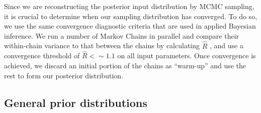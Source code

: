 \documentclass[10pt,letterpaper]{article}
\begin{document}
Since we are reconstructing the posterior input distribution by MCMC sampling, it is crucial to determine when our sampling distribution has converged. To do so, we use the same convergence diagnostic criteria that are used in applied Bayesian inference. We run a number of Markov Chains in parallel and compare their within-chain variance to that between the chains by calculating $\hat{R}$ \cite{gelman1992inference}, and use a convergence threshold of $\hat{R}<\sim 1.1$ on all input parameters. Once convergence is achieved, we discard an initial portion of the chains as ``warm-up'' \cite{gelman2013bayesian,lambert2018Student} and use the rest to form our posterior distribution.


\subsection{General prior distributions}
\label{sec:general_priors}
\end{document}
